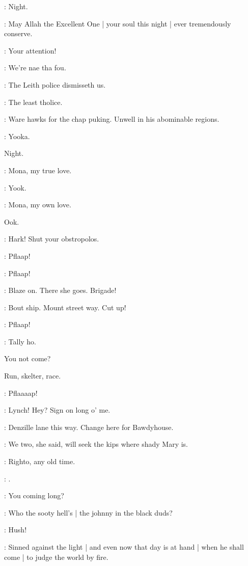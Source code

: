 \punch:
Night.

\dixon:
May Allah the Excellent One |
your soul this night |
ever tremendously conserve.


\lenehan:
Your attention!

\crotthers:
We're nae tha fou.

\lynch:
The Leith police dismisseth us.

\lenehan:
The least tholice.

\punch:
Ware hawks for the chap puking.
Unwell in his abominable regions.

\stephen:
Yooka.

Night.

\crotthers:
Mona,
my true love.

\lynch:
Yook.

\crotthers:
Mona,
my own love.

Ook.


\lynch:
Hark!
Shut your obstropolos.

:
Pflaap!

:
Pflaap!

\lenehan:
Blaze on.
There she goes.
Brigade!

\punch:
Bout ship.
Mount street way.
Cut up!

:
Pflaap!

\lynch:
Tally ho.

You not come?

Run,
skelter,
race.

:
Pflaaaap!


\stephen:
Lynch!
Hey?
Sign on long o' me.

\lynch:
Denzille lane this way.
Change here for Bawdyhouse.

\stephen:
We two,
she said,
will seek the kips where shady Mary is.

\lynch:
Righto,
any old time.

\stephen:
.

\lynch:
You coming long?

\stephen:
Who the sooty hell's |
the johnny in the black duds?

\lynch:
Hush!

\dowie:
Sinned against the light |
and even now that day is at hand |
when he shall come |
to judge the world by fire.

